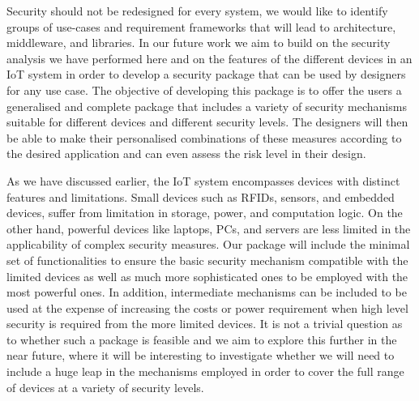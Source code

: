 \documentclass{llncs}
\begin{document}
Security should not be redesigned for every system, we would like to identify groups of use-cases and requirement frameworks that will lead to architecture, middleware, and libraries. In our future work we aim to build on the security analysis we have performed here and on the features of the different devices in an IoT system in order to develop a security package that can be used by designers for any use case. The objective of developing this package is to offer the users a generalised and complete package that includes a variety of security mechanisms suitable for different devices and different security levels. The designers will then be able to make their personalised combinations of these measures according to the desired application and can even assess the risk level in their design. 

As we have discussed earlier, the IoT system encompasses devices with distinct features and limitations. Small devices such as RFIDs, sensors, and embedded devices, suffer from limitation in storage, power, and computation logic. On the other hand, powerful devices like laptops, PCs, and servers are less limited in the applicability of complex security measures. Our package will include the minimal set of functionalities to ensure the basic security mechanism compatible with the limited devices as well as much more sophisticated ones to be employed with the most powerful ones. In addition, intermediate mechanisms can be included to be used at the expense of increasing the costs or power requirement when high level security is required from the more limited devices. It is not a trivial question as to whether such a package is feasible and we aim to explore this further in the near future, where it will be interesting to investigate whether we will need to include a huge leap in the mechanisms employed in order to cover the full range of devices at a variety of security levels.
\end{document}
